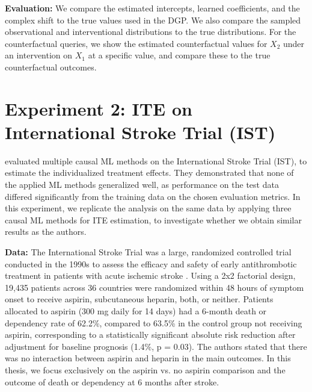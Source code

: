 \textbf{Evaluation: } We compare the estimated intercepts, learned coefficients, and the complex shift to the true values used in the DGP. We also compare the sampled observational and interventional distributions to the true distributions. For the counterfactual queries, we show the estimated counterfactual values for $X_2$ under an intervention on $X_1$ at a specific value, and compare these to the true counterfactual outcomes.




\section{Experiment 2: ITE on International Stroke Trial (IST)} \label{sec:methods_experiment2}





% 
% 
\citet{chen2025} evaluated multiple causal ML methods on the International Stroke Trial (IST), to estimate the individualized treatment effects. They demonstrated that none of the applied ML methods generalized well, as performance on the test data differed significantly from the training data on the chosen evaluation metrics.
In this experiment, we replicate the analysis on the same data by applying three causal ML methods for ITE estimation, to investigate whether we obtain similar results as the authors.


\textbf{Data:} The International Stroke Trial was a large, randomized controlled trial conducted in the 1990s to assess the efficacy and safety of early antithrombotic treatment in patients with acute ischemic stroke \citep{IST1997}. Using a 2x2 factorial design, 19,435 patients across 36 countries were randomized within 48 hours of symptom onset to receive aspirin, subcutaneous heparin, both, or neither. Patients allocated to aspirin (300 mg daily for 14 days) had a 6-month death or dependency rate of 62.2\%, compared to 63.5\% in the control group not receiving aspirin, corresponding to a statistically significant absolute risk reduction after adjustment for baseline prognosis (1.4\%, p = 0.03). The authors stated that there was no interaction between aspirin and heparin in the main outcomes. In this thesis, we focus exclusively on the aspirin vs. no aspirin comparison and the outcome of death or dependency at 6 months after stroke.

